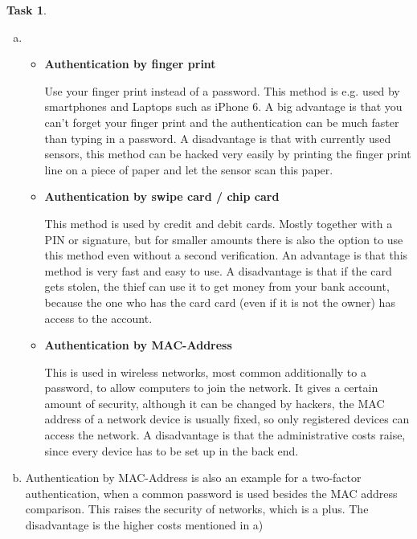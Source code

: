 \documentclass[ngerman, fleqn, DIV=15, headinclude]{scrartcl}
\theoremstyle{definition}
\newtheorem{exercise}{Task}
\begin{document}
\begin{exercise}\hfill

    \begin{enumerate}[a)]
        \item \hfill

            \begin{itemize}
                \item \textbf{Authentication by finger print}

                    Use your finger print instead of a password. This method
                    is e.g. used by smartphones and Laptops such as iPhone 6.
                    A big advantage is that you can't forget your finger print
                    and the authentication can be much faster than typing in a
                    password.  A disadvantage is that with currently used
                    sensors, this method can be hacked very easily by printing
                    the finger print line on a piece of paper and let the
                    sensor scan this paper.
        
                \item \textbf{Authentication by swipe card / chip card}

                    This method is used by credit and debit cards. Mostly together with
                    a PIN or signature, but for smaller amounts there is also the
                    option to use this method even without a second verification.  An
                    advantage is that this method is very fast and easy to use.  A
                    disadvantage is that if the card gets stolen, the thief can use it
                    to get money from your bank account, because the one who has the
                    card card (even if it is not the owner) has access to the account.
            
                \item \textbf{Authentication by MAC-Address}

                    This is used in wireless networks, most common additionally to a
                    password, to allow computers to join the network.  It gives a
                    certain amount of security, although it can be changed by hackers,
                    the MAC address of a network device is usually fixed, so only
                    registered devices can access the network.  A disadvantage is that
                    the administrative costs raise, since every device has to be set up
                    in the back end.

            \end{itemize}
        \item Authentication by MAC-Address is also an example for a two-factor authentication, when a common password is used besides the MAC address comparison.
                This raises the security of networks, which is a plus. The disadvantage is the higher costs mentioned in a)
    \end{enumerate}
\end{exercise}
\end{document}
